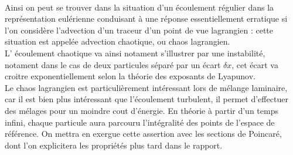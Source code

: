 \documentclass[a4paper,12pt,titlepage]{report}
\begin{document}
\\
Ainsi on peut se trouver dans la situation d'un écoulement régulier dans la représentation eulérienne conduisant à une réponse essentiellement erratique si l'on considère l'advection d'un traceur d'un point de vue lagrangien : cette situation est appelée advection chaotique, ou chaos lagrangien.\\
L' écoulement chaotique va ainsi notament s'illustrer par une instabilité, notament dans le cas de deux particules séparé par un écart $\delta x$, cet écart va croitre exponentiellement selon la théorie des exposants de Lyapunov. 
\\
Le chaos lagrangien est particulièrement intéressant lors de mélange laminaire, car il est bien plus intéressant que l'écoulement turbulent, il permet d'effectuer des mélages pour un moindre cout d'énergie. En théorie à partir d'un temps infini, chaque particule aura parcouru l'intégralité des points de l'espace de référence.  On mettra en exergue cette assertion avec les sections de Poincaré, dont l'on explicitera les propriétés plus tard dans le rapport. 
\end{document}
